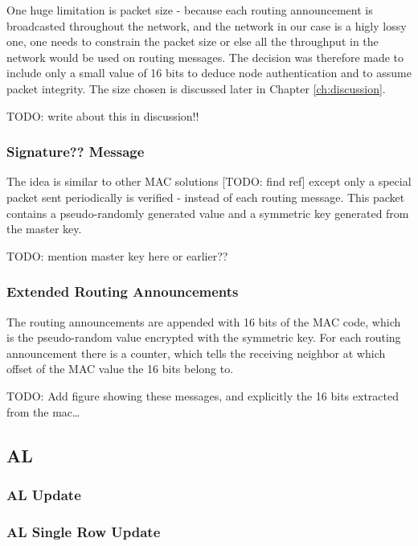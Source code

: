 One huge limitation is packet size - because each routing announcement is
broadcasted throughout the network, and the network in our case is a higly lossy
one, one needs to constrain the packet size or else all the throughput in the
network would be used on routing messages. The decision was therefore made to
include only a small value of 16 bits to deduce node authentication and to
assume packet integrity. The size chosen is discussed later in Chapter
\ref{ch:discussion}.

TODO: write about this in discussion!!

\subsubsection*{Signature?? Message}

The idea is similar to other \ac{MAC} solutions [TODO: find ref] except only a
special packet sent periodically is verified - instead of each routing message.
This packet contains a pseudo-randomly generated value and a symmetric key
generated from the master key.

TODO: mention master key here or earlier??

\subsubsection*{Extended Routing Announcements}

The routing announcements are appended with 16 bits of the \ac{MAC} code, which
is the pseudo-random value encrypted with the symmetric key. For each routing
announcement there is a counter, which tells the receiving neighbor at which
offset of the \ac{MAC} value the 16 bits belong to.

TODO: Add figure showing these messages, and explicitly the 16 bits extracted
from the mac\ldots




\subsection{\acf{AL}}

\subsubsection*{\acf{AL} Update}

\subsubsection*{\acf{AL} Single Row Update}